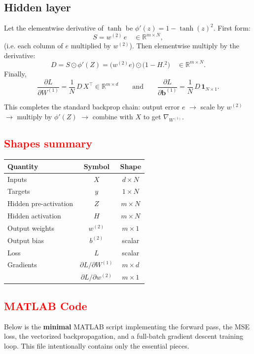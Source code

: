 \documentclass[11pt,a4paper]{article}
\begin{document}
\subsection*{Hidden layer}
Let the elementwise derivative of $\tanh$ be $\phi'(z) = 1 - \tanh(z)^2$.
First form:
\[
S = w^{(2)}\, e \quad\in\mathbb{R}^{m\times N},
\]
(i.e. each column of $e$ multiplied by $w^{(2)}$). Then elementwise multiply by the derivative:
\[
D = S \odot \phi'(Z) = \big(w^{(2)} e\big) \odot \big(1 - H.^2\big) \quad\in\mathbb{R}^{m\times N}.
\]
Finally,
\[
\boxed{\displaystyle \frac{\partial L}{\partial W^{(1)}} = \frac{1}{N}\, D\, X^\top \in\mathbb{R}^{m\times d}}
\qquad\text{and}\qquad
\boxed{\displaystyle \frac{\partial L}{\partial \mathbf{b}^{(1)}} = \frac{1}{N}\,D\,\mathbf{1}_{N\times 1}.}
\]

This completes the standard backprop chain: output error $e$ $\rightarrow$ scale by $w^{(2)}$ $\rightarrow$ multiply by $\phi'(Z)$ $\rightarrow$ combine with $X$ to get $\nabla_{W^{(1)}}$.

\subsection{\textcolor{red}{Shapes summary}}
\begin{center}
\begin{tabular}{@{}lcc@{}}
\toprule
Quantity & Symbol & Shape \\ \midrule
Inputs & $X$ & $d\times N$ \\
Targets & $y$ & $1\times N$ \\
Hidden pre-activation & $Z$ & $m\times N$ \\
Hidden activation & $H$ & $m\times N$ \\
Output weights & $w^{(2)}$ & $m\times 1$ \\
Output bias & $b^{(2)}$ & scalar \\
Loss & $L$ & scalar \\
Gradients & $\partial L/\partial W^{(1)}$ & $m\times d$ \\
& $\partial L/\partial w^{(2)}$ & $m\times 1$ \\
\bottomrule
\end{tabular}
\end{center}

\subsection{\textcolor{red}{ MATLAB Code}}
Below is the \textbf{minimal} MATLAB script implementing the forward pass, the MSE loss, the vectorized backpropagation, and a full-batch gradient descent training loop. This file intentionally contains only the essential pieces.
\end{document}
